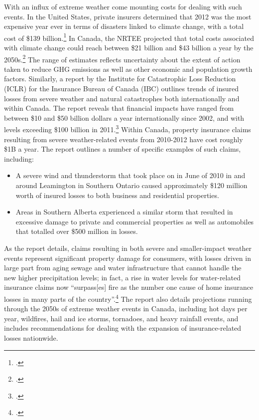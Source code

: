 With an influx of extreme weather come mounting costs for dealing with such events. 
In the United States, private insurers determined that 2012 was the most expensive year ever in terms of disasters linked to climate change, with a total cost of \$139 billion.\footcite[][]{BlownAway}
In Canada, the NRTEE projected that total costs associated with climate change could reach between \$21 billion and \$43 billion a year by the 2050s.\footcite[][p.15]{NRTEEPrice}
The range of estimates reflects uncertainty about the extent of action taken to reduce GHG emissions as well as other economic and population growth factors. 
Similarly, a report by the Institute for Catastrophic Loss Reduction (ICLR) for the Insurance Bureau of Canada (IBC) outlines trends of insured losses from severe weather and natural catastrophes both internationally and within Canada. 
The report reveals that financial impacts have ranged from between \$10 and \$50 billion dollars a year internationally since 2002, and with levels exceeding \$100 billion in 2011.\footcite[][p. 5]{TellingWeatherStory}
Within Canada, property insurance claims resulting from severe weather-related events from 2010-2012 have cost roughly \$1B a year.
The report outlines a number of specific examples of such claims, including:
\begin{itemize}
	\item A severe wind and thunderstorm that took place on in June of 2010 in and around Leamington in Southern Ontario caused approximately \$120 million worth of insured losses to both business and residential properties.
	\item Areas in Southern Alberta experienced a similar storm that resulted in excessive damage to private and commercial properties as well as automobiles that totalled over \$500 million in losses.
\end{itemize}
As the report details, claims resulting in both severe and smaller-impact weather events represent significant property damage for consumers, with losses driven in large part from aging sewage and water infrastructure that cannot handle the new higher precipitation levels; in fact, a rise in water levels for water-related insurance claims now ``surpass[es] fire as the number one cause of home insurance losses in many parts of the country''.\footcite[][p. 7]{TellingWeatherStory}
The report also details projections running through the 2050s of extreme weather events in Canada, including hot days per year, wildfires, hail and ice storms, tornadoes, and heavy rainfall events, and includes recommendations for dealing with the expansion of insurance-related losses nationwide.



